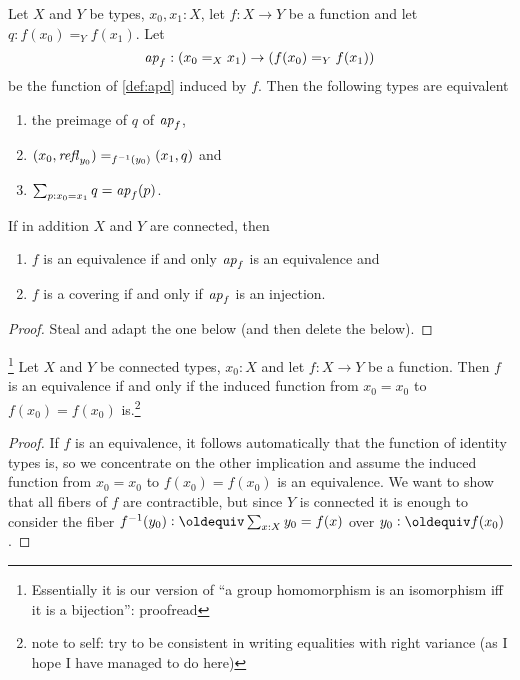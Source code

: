 {{\begin{lemma}
  \label{lem:eqandcovofconntypes}
  Let $X$ and $Y$ be types, $x_0,x_1:X$, let $f:X\to Y$ be a function and let $q:f(x_0)=_Yf(x_1)$. Let 
    $$%
\ap f:(x_0=_Xx_1)\to (f(x_0)=_Yf(x_1))$$
be the function of \cref{def:apd} induced by $f$.  Then the following types are equivalent
  \begin{enumerate}
  \item the preimage of $q$ of $\mathop{{\it ap}_{f}}$,  
  \item $(x_0,\mathop{{\it refl}_{y_0}})=_{f^{-1}(y_0)}(x_1,q)$ and
  \item $\sum_{p:x_0=x_1}q=\mathop{{\it ap}_{f}}(p)$.
  \end{enumerate}
If in addition $X$ and $Y$ are connected, then
\begin{enumerate}
\item $f$ is an equivalence if and only $\ap f%
$ is an equivalence and
\item $f$ is a covering if and only if  $\ap f%
$ is an injection.
\end{enumerate}

\end{lemma}
\begin{proof}
  Steal and adapt the one below (and then delete the below).
\end{proof}

\begin{lemma}\label{lem:eqofconntypes}\footnote{
Essentially it is our version of ``a group homomorphism is an isomorphism iff it is a bijection'': proofread}
  Let $X$ and $Y$ be connected types, $x_0:X$ and let $f:X\to Y$ be a function.  Then $f$ is an equivalence if and only if the induced function from $x_0=x_0$ to $f(x_0)=f(x_0)$ is.\footnote{note to self: try to be consistent in writing equalities with right variance (as I hope I have managed to do here)}
\end{lemma}
\begin{proof}
  If $f$ is an equivalence, it follows automatically that the function of identity types is, so we concentrate on the other implication and assume the induced function from $x_0=x_0$ to $f(x_0)=f(x_0)$ is an equivalence.  We want to show that all fibers of $f$ are contractible, but since $Y$ is connected it is enough to consider the fiber $f^{-1}(y_0)\defequi\sum_{x:X}y_0=f(x)$ over $y_0\defequi f(x_0)$.  


\end{proof}}}
